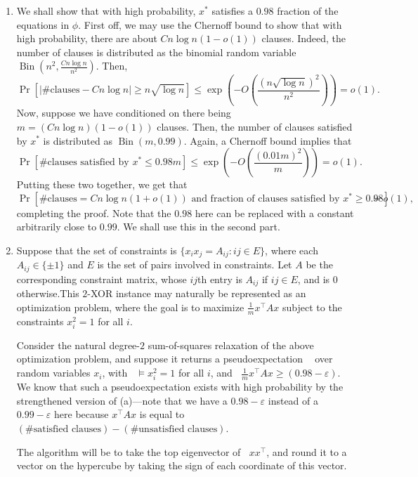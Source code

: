 \documentclass[11pt]{article}
\theoremstyle{definition}
\renewcommand{\epsilon}{\varepsilon}
\newcommand{\eps}{\epsilon}
\DeclareMathOperator{\pE}{\widetilde{\mathbb{E}}} %
\newcommand{\Bin}{\operatorname{Bin}}
\begin{document}
  \begin{enumerate}[label=(\alph*)]
    \item We shall show that with high probability, $x^*$ satisfies a $0.98$ fraction of the equations in $\phi$. First off, we may use the Chernoff bound to show that with high probability, there are about $C n \log n (1-o(1))$ clauses. Indeed, the number of clauses is distributed as the binomial random variable $\Bin(n^2 , \frac{C n \log n}{n^2})$. Then,
    \[ \Pr \left[ \left|\text{\# clauses} - C n \log n \right| \ge n \sqrt{\log n} \right] \le \exp\left( - O\left(\frac{(n \sqrt{\log n})^2}{n^2}\right) \right) = o(1). \]
    Now, suppose we have conditioned on there being $m = (C n \log n)(1-o(1))$ clauses. Then, the number of clauses satisfied by $x^*$ is distributed as $\Bin(m , 0.99)$. Again, a Chernoff bound implies that
    \[ \Pr\left[ \text{\# clauses satisfied by $x^*$} \le 0.98m \right] \le \exp\left( - O \left( \frac{(0.01m)^2}{m} \right) \right) = o(1). \]
    Putting these two together, we get that
    \[ \Pr\left[ \text{\# clauses} = Cn\log n(1+o(1)) \text{ and } \text{fraction of clauses satisfied by $x^*$} \ge 0.98 \right] = o(1), \]
    completing the proof. Note that the $0.98$ here can be replaced with a constant arbitrarily close to $0.99$. We shall use this in the second part.

    \item Suppose that the set of constraints is $\{x_i x_j = A_{ij} : ij \in E\}$, where each $A_{ij} \in \{\pm 1\}$ and $E$ is the set of pairs involved in constraints. Let $A$ be the corresponding constraint matrix, whose $ij$th entry is $A_{ij}$ if $ij \in E$, and is $0$ otherwise.This $2$-XOR instance may naturally be represented as an optimization problem, where the goal is to maximize $\frac{1}{m} x^\top A x$ subject to the constraints $x_i^2 = 1$ for all $i$.

    Consider the natural degree-$2$ sum-of-squares relaxation of the above optimization problem, and suppose it returns a pseudoexpectation $\pE$ over random variables $x_i$, with $\pE \vDash x_i^2 = 1$ for all $i$, and $\pE \frac{1}{m} x^\top A x \ge (0.98-\eps)$. We know that such a pseudoexpectation exists with high probability by the strengthened version of (a)---note that we have a $0.98-\eps$ instead of a $0.99-\eps$ here because $x^\top A x$ is equal to $(\# \text{satisfied clauses}) - (\# \text{unsatisfied clauses})$.

    The algorithm will be to take the top eigenvector of $\pE xx^\top$, and round it to a vector on the hypercube by taking the sign of each coordinate of this vector.
    

\end{enumerate}
\end{document}
